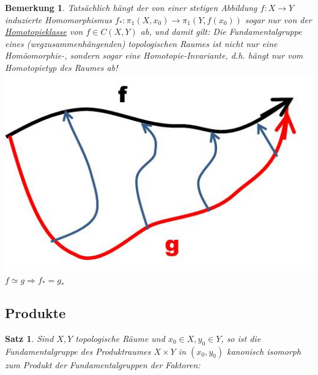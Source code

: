 \documentclass[a4paper,11pt,notitlepage]{report}
\newtheorem{theorem}{Satz}[chapter]
\newtheorem{remark}{Bemerkung}[chapter]
\begin{document}
\begin{remark}
	Tatsächlich hängt der von einer stetigen Abbildung $f \colon X \rightarrow Y$ induzierte Homomorphismus $f_* \colon \pi_1(X,x_0) \rightarrow \pi_1(Y,f(x_0))$ sogar nur von der \underline{Homotopieklasse} von $f \in C(X,Y)$ ab, und damit gilt:
	\newline
	Die Fundamentalgruppe eines (wegzusammenhängenden) topologischen Raumes ist nicht nur eine Homöomorphie-, sondern sogar eine Homotopie-Invariante, d.h. hängt nur vom Homotopietyp des Raumes ab! \newline
	\includegraphics[scale=0.4]{images/f_g_homotop.jpg}
	\newline
	$f \simeq g \Rightarrow f_* = g_*$
\end{remark}

\newpage
\subsection{Produkte}
\begin{theorem}
	Sind $X,Y$ topologische Räume und $x_0 \in X, y_0 \in Y$, so ist die Fundamentalgruppe des Produktraumes $X \times Y$ in $(x_0,y_0)$ kanonisch isomorph zum Produkt der Fundamentalgruppen der Faktoren:
	\begin{center}
	\end{center}
\end{theorem}
\end{document}
